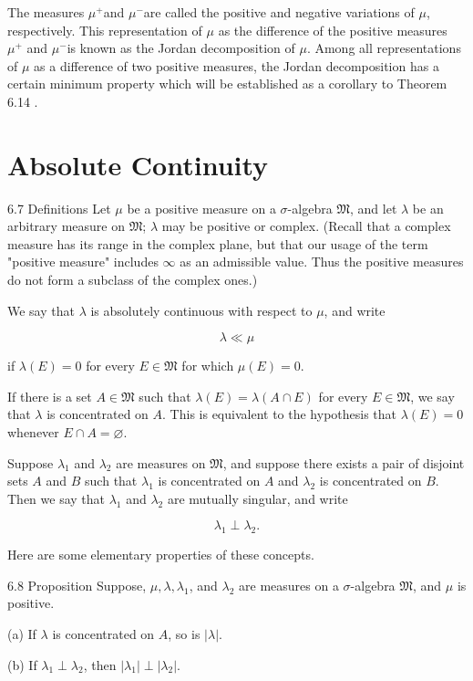 \documentclass[10pt]{article}
\begin{document}
The measures $\mu^{+}$and $\mu^{-}$are called the positive and negative variations of $\mu$, respectively. This representation of $\mu$ as the difference of the positive measures $\mu^{+}$ and $\mu^{-}$is known as the Jordan decomposition of $\mu$. Among all representations of $\mu$ as a difference of two positive measures, the Jordan decomposition has a certain minimum property which will be established as a corollary to Theorem 6.14 .

\section{Absolute Continuity}
6.7 Definitions Let $\mu$ be a positive measure on a $\sigma$-algebra $\mathfrak{M}$, and let $\lambda$ be an arbitrary measure on $\mathfrak{M}$; $\lambda$ may be positive or complex. (Recall that a complex measure has its range in the complex plane, but that our usage of the term "positive measure" includes $\infty$ as an admissible value. Thus the positive measures do not form a subclass of the complex ones.)

We say that $\lambda$ is absolutely continuous with respect to $\mu$, and write

$$
\lambda \ll \mu
$$

if $\lambda(E)=0$ for every $E \in \mathfrak{M}$ for which $\mu(E)=0$.

If there is a set $A \in \mathfrak{M}$ such that $\lambda(E)=\lambda(A \cap E)$ for every $E \in \mathfrak{M}$, we say that $\lambda$ is concentrated on $A$. This is equivalent to the hypothesis that $\lambda(E)=0$ whenever $E \cap A=\varnothing$.

Suppose $\lambda_{1}$ and $\lambda_{2}$ are measures on $\mathfrak{M}$, and suppose there exists a pair of disjoint sets $A$ and $B$ such that $\lambda_{1}$ is concentrated on $A$ and $\lambda_{2}$ is concentrated on $B$. Then we say that $\lambda_{1}$ and $\lambda_{2}$ are mutually singular, and write

$$
\lambda_{1} \perp \lambda_{2} .
$$

Here are some elementary properties of these concepts.

6.8 Proposition Suppose, $\mu, \lambda, \lambda_{1}$, and $\lambda_{2}$ are measures on a $\sigma$-algebra $\mathfrak{M}$, and $\mu$ is positive.

(a) If $\lambda$ is concentrated on $A$, so is $|\lambda|$.

(b) If $\lambda_{1} \perp \lambda_{2}$, then $\left|\lambda_{1}\right| \perp\left|\lambda_{2}\right|$.
\end{document}
